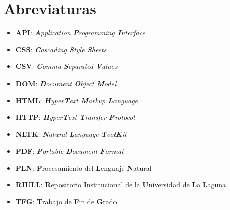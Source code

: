 \chapter{Abreviaturas}
\begin{itemize}
    \item \textbf{API}: \textit{\textbf{A}pplication \textbf{P}rogramming \textbf{I}nterface}
    \item \textbf{CSS}: \textit{\textbf{C}ascading \textbf{S}tyle \textbf{S}heets}
    \item \textbf{CSV}: \textit{\textbf{C}omma \textbf{S}eparated \textbf{V}alues}
    \item \textbf{DOM}: \textit{\textbf{D}ocument \textbf{O}bject \textbf{M}odel}
    \item \textbf{HTML}: \textit{\textbf{H}yper\textbf{T}ext  \textbf{M}arkup \textbf{L}anguage}
    \item \textbf{HTTP}: \textit{\textbf{H}yper\textbf{T}ext  \textbf{T}ransfer \textbf{P}rotocol}
    \item \textbf{NLTK}: \textit{\textbf{N}atural \textbf{L}anguage \textbf{T}ool\textbf{K}it}
    \item \textbf{PDF}: \textit{\textbf{P}ortable \textbf{D}ocument \textbf{F}ormat}
    \item \textbf{PLN}: \textbf{P}rocesamiento del \textbf{L}enguaje \textbf{N}atural
    \item \textbf{RIULL}: \textbf{R}epositorio \textbf{I}nstitucional de la \textbf{U}niversidad de \textbf{L}a \textbf{L}aguna
    \item \textbf{TFG}: \textbf{T}rabajo de \textbf{F}in de \textbf{G}rado
\end{itemize}